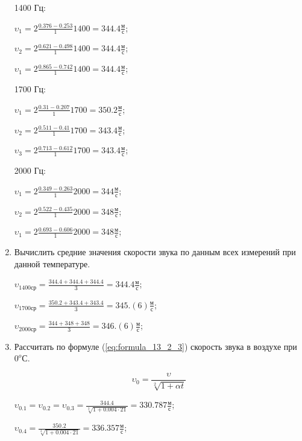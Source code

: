 \begin{enumerate}
{            1400 Гц:

            $\upsilon_1 = 2 \frac{0.376 - 0.253}{1} 1400 = 344.4 \frac{\text{м}}{\text{с}}$;

            $\upsilon_2 = 2 \frac{0.621 - 0.498}{1} 1400 = 344.4 \frac{\text{м}}{\text{с}}$;

            $\upsilon_1 = 2 \frac{0.865 - 0.742}{1} 1400 = 344.4 \frac{\text{м}}{\text{с}}$;

            1700 Гц:

            $\upsilon_1 = 2 \frac{0.31 - 0.207}{1} 1700 = 350.2 \frac{\text{м}}{\text{с}}$;

            $\upsilon_2 = 2 \frac{0.511 - 0.41}{1} 1700 = 343.4 \frac{\text{м}}{\text{с}}$;

            $\upsilon_3 = 2 \frac{0.713 - 0.612}{1} 1700 = 343.4 \frac{\text{м}}{\text{с}}$;

            2000 Гц:

            $\upsilon_1 = 2 \frac{0.349 - 0.263}{1} 2000 = 344 \frac{\text{м}}{\text{с}}$;

            $\upsilon_2 = 2 \frac{0.522 - 0.435}{1} 2000 = 348 \frac{\text{м}}{\text{с}}$;

            $\upsilon_1 = 2 \frac{0.693 - 0.606}{1} 2000 = 348 \frac{\text{м}}{\text{с}}$;
        }
    \item{Вычислить средние значения скорости звука по данным всех измерений при данной температуре.

            $\upsilon_\text{1400ср} = \frac{344.4 + 344.4 + 344.4}{3} = 344.4 \frac{\text{м}}{\text{с}}$;

            $\upsilon_\text{1700ср} = \frac{350.2 + 343.4 + 343.4}{3} = 345.(6) \frac{\text{м}}{\text{с}}$;

            $\upsilon_\text{2000ср} = \frac{344 + 348 + 348}{3} = 346.(6) \frac{\text{м}}{\text{с}}$;
        }
    \item{Рассчитать  по формуле (\ref{eq:formula_13_2_3}) скорость  звука в воздухе при $0^o$С.

            \begin{equation}
                \upsilon_0 = \frac{\upsilon}{\sqrt[2]{1 + \alpha t}}
                \label{eq:formula_13_2_3}
            \end{equation}

            $\upsilon_{0.1} = \upsilon_{0.2} = \upsilon_{0.3} = \frac{344.4}{\sqrt[2]{1 + 0.004 \cdot 21}} = 330.787 \frac{\text{м}}{\text{с}}$;

            $\upsilon_{0.4} = \frac{350.2}{\sqrt[2]{1 + 0.004 \cdot 21}} = 336.357 \frac{\text{м}}{\text{с}}$;

}
\end{enumerate}
